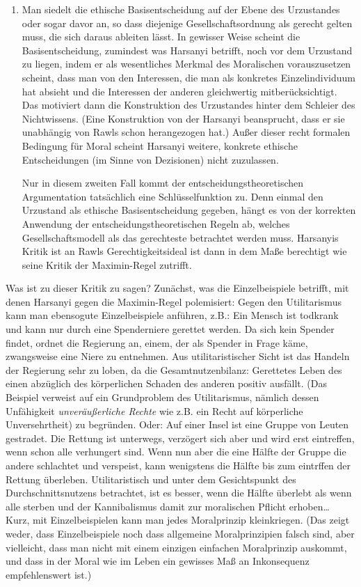 \begin{enumerate}
\item {} 
  Man siedelt die ethische Basisentscheidung auf der Ebene des
  Urzustandes oder sogar davor an, so dass diejenige Gesellschaftsordnung als
  gerecht gelten muss, die sich daraus ableiten lässt. In gewisser Weise scheint
  die Basisentscheidung, zumindest was Harsanyi betrifft, noch vor dem Urzustand
  zu liegen, indem er als wesentliches Merkmal des Moralischen vorauszusetzen
  scheint, dass man von den Interessen, die man als konkretes Einzelindividuum
  hat absieht und die Interessen der anderen gleichwertig mitberücksichtigt. Das
  motiviert dann die Konstruktion des Urzustandes hinter dem Schleier des
  Nichtwissens. (Eine Konstruktion von der Harsanyi beansprucht, dass er sie
  unabhängig von Rawls schon herangezogen hat.) Außer dieser recht formalen
  Bedingung für Moral scheint Harsanyi weitere, konkrete ethische Entscheidungen
  (im Sinne von Dezisionen) nicht zuzulassen.

  Nur in diesem zweiten Fall kommt der entscheidungstheoretischen
  Argumentation tatsächlich eine Schlüsselfunktion zu. Denn einmal den
  Urzustand als ethische Basisentscheidung gegeben, hängt es von der
  korrekten Anwendung der entscheidungstheoretischen Regeln ab,
  welches Gesellschaftsmodell als das gerechteste betrachtet werden
  muss. Harsanyis Kritik ist an Rawls Gerechtigkeitsideal ist dann in
  dem Maße berechtigt wie seine Kritik der Maximin-Regel zutrifft.

\end{enumerate}


Was ist zu dieser Kritik zu sagen? Zunächst, was die Einzelbeispiele betrifft,
mit denen Harsanyi gegen die Maximin-Regel polemisiert:
Gegen den Utilitarismus kann man ebensogute Einzelbeispiele anführen, z.B.: Ein
Mensch ist todkrank und kann nur durch eine Spenderniere gerettet werden. Da sich
kein Spender findet, ordnet die Regierung an, einem, der als Spender in Frage
käme, zwangsweise eine Niere zu entnehmen. Aus utilitaristischer Sicht ist das
Handeln der Regierung sehr zu loben, da die Gesamtnutzenbilanz: Gerettetes Leben des
einen abzüglich des körperlichen Schaden des anderen positiv ausfällt. (Das
Beispiel verweist auf ein Grundproblem des Utilitarismus, nämlich dessen
Unfähigkeit {\em unveräußerliche Rechte} wie z.B. ein Recht auf körperliche
Unversehrtheit) zu begründen. Oder: Auf einer Insel ist eine Gruppe von Leuten
gestradet. Die Rettung ist unterwegs, verzögert sich aber und wird erst
eintreffen, wenn schon alle verhungert sind. Wenn nun aber die eine Hälfte der
Gruppe die andere schlachtet und verspeist, kann wenigstens die Hälfte bis zum
eintrffen der Rettung überleben. Utilitaristisch und unter dem Gesichtspunkt des
Durchschnittsnutzens betrachtet, ist es besser, wenn die Hälfte überlebt als wenn
alle sterben und der Kannibalismus damit zur moralischen Pflicht erhoben\ldots
Kurz, mit Einzelbeispielen kann man jedes Moralprinzip kleinkriegen. (Das zeigt
weder, dass Einzelbeispiele noch dass allgemeine Moralprinzipien falsch sind,
aber vielleicht, dass man nicht mit einem einzigen einfachen Moralprinzip
auskommt, und dass in der Moral wie im Leben ein gewisses Maß an Inkonsequenz
empfehlenswert ist.)

